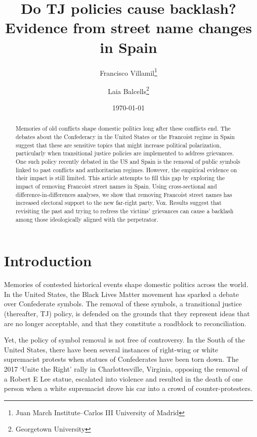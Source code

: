 \documentclass[12pt, notitlepage]{article}
\title{\Large Do TJ policies cause backlash?\\Evidence from street name changes in Spain}
\author{Francisco Villamil\footnote{Juan March Institute--Carlos III University of Madrid} \and Laia Balcells\footnote{Georgetown University}}
\date{\today}
\begin{document}
\maketitle

\begin{abstract}
Memories of old conflicts shape domestic politics long after these conflicts end. The debates about the Confederacy in the United States or the Francoist regime in Spain suggest that these are sensitive topics that might increase political polarization, particularly when transitional justice policies are implemented to address grievances. One such policy recently debated in the US and Spain is the removal of public symbols linked to past conflicts and authoritarian regimes. However, the empirical evidence on their impact is still limited. This article attempts to fill this gap by exploring the impact of removing Francoist street names in Spain. Using cross-sectional and difference-in-differences analyses, we show that removing Francoist street names has increased electoral support to the new far-right party, Vox. Results suggest that revisiting the past and trying to redress the victims' grievances can cause a backlash among those ideologically aligned with the perpetrator.

\vspace{10pt}
\noindent

\end{abstract}

\newpage
\section*{Introduction}

Memories of contested historical events shape domestic politics across the world.
In the United States, the Black Lives Matter movement has sparked a debate over Confederate symbols.%
The removal of these symbols, a transitional justice (thereafter, TJ) policy, is defended on the grounds that they represent ideas that are no longer acceptable, and that they constitute a roadblock to reconciliation.

Yet, the policy of symbol removal is not free of controversy.
In the South of the United States, there have been several instances of right-wing or white supremacist protests when statues of Confederates have been torn down.
The 2017 `Unite the Right' rally in Charlottesville, Virginia, opposing the removal of a Robert E Lee statue, escalated into violence and resulted in the death of one person when a white supremacist drove his car into a crowd of counter-protesters.
\end{document}
